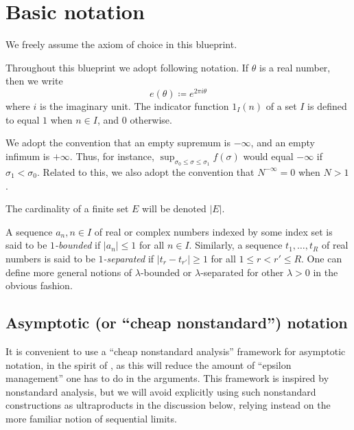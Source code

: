 \chapter{Basic notation}

We freely assume the axiom of choice in this blueprint.

Throughout this blueprint we adopt following notation. If $\theta$ is a real number, then we write
$$ e(\theta) \coloneqq e^{2\pi i\theta}$$
where $i$ is the imaginary unit. The indicator function $1_I(n)$ of a set $I$ is defined to equal $1$ when $n \in I$, and $0$ otherwise.

We adopt the convention that an empty supremum is $-\infty$, and an empty infimum is $+\infty$.  Thus, for instance, $\sup_{\sigma_0 \leq \sigma \leq \sigma_1} f(\sigma)$ would equal $-\infty$ if $\sigma_1 < \sigma_0$.  Related to this, we also adopt the convention that $N^{-\infty}=0$ when $N > 1$.

The cardinality of a finite set $E$ will be denoted $|E|$.

A sequence $a_n, n \in I$ of real or complex numbers indexed by some index set is said to be \emph{$1$-bounded} if $|a_n| \leq 1$ for all $n \in I$.  Similarly, a sequence $t_1,\dots,t_R$ of real numbers is said to be \emph{$1$-separated} if $|t_r-t_{r'}| \geq 1$ for all $1 \leq r < r' \leq R$.  One can define more general notions of $\lambda$-bounded or $\lambda$-separated for other $\lambda>0$ in the obvious fashion.

\section{Asymptotic (or ``cheap nonstandard'') notation}

It is convenient to use a ``cheap nonstandard analysis'' framework for asymptotic notation, in the spirit of \cite{tao-cheap}, as this will reduce the amount of ``epsilon management'' one has to do in the arguments.  This framework is inspired by nonstandard analysis, but we will avoid explicitly using such nonstandard constructions as ultraproducts in the discussion below, relying instead on the more familiar notion of sequential limits.

